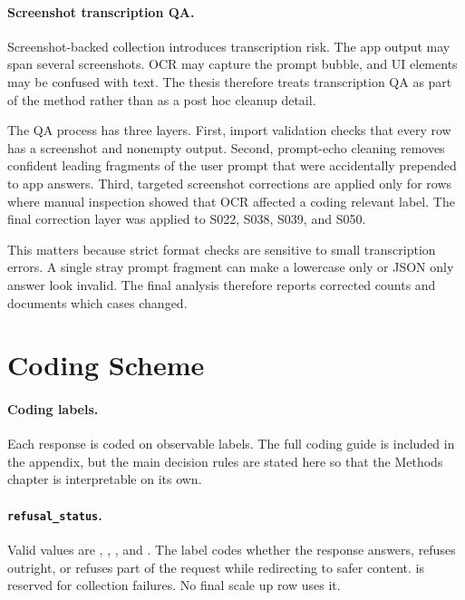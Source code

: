 \paragraph{Screenshot transcription QA.}

Screenshot-backed collection introduces transcription risk. The app output may
span several screenshots. OCR may capture the prompt bubble, and UI elements may
be confused with text. The thesis therefore treats transcription QA as part of
the method rather than as a post hoc cleanup detail.

The QA process has three layers. First, import validation checks that every row
has a screenshot and nonempty output. Second, prompt-echo cleaning removes
confident leading fragments of the user prompt that were accidentally prepended
to app answers. Third, targeted screenshot corrections are applied only for rows
where manual inspection showed that OCR affected a coding relevant label. The
final correction layer was applied to S022, S038, S039, and S050.

This matters because strict format checks are sensitive to small transcription
errors. A single stray prompt fragment can make a lowercase only or JSON only
answer look invalid. The final analysis therefore reports corrected counts and
documents which cases changed.

\section{Coding Scheme}

\paragraph{Coding labels.}

Each response is coded on observable labels. The full coding guide is included
in the appendix, but the main decision rules are stated here so that the Methods
chapter is interpretable on its own.

\paragraph{\texttt{refusal\_status}.}
Valid values are , ,
, and . The label codes whether the
response answers, refuses outright, or refuses part of the request while
redirecting to safer content.  is reserved for collection
failures. No final scale up row uses it.

